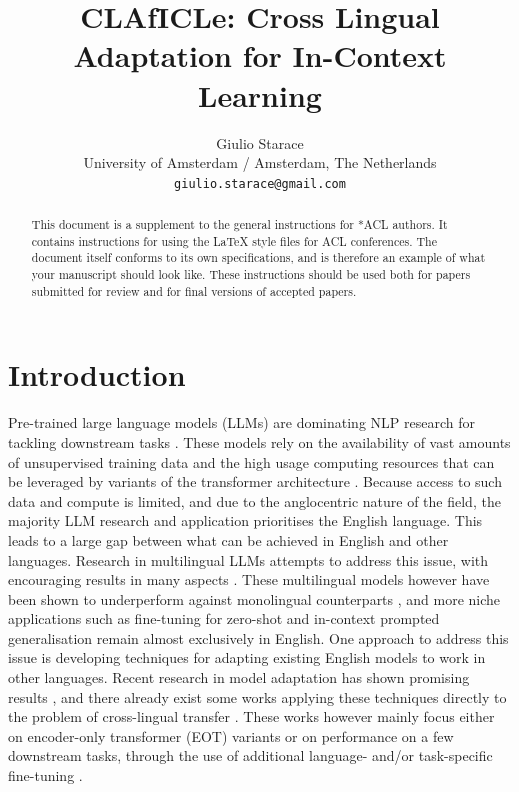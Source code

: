 \documentclass[11pt]{article}
\title{CLAfICLe: Cross Lingual Adaptation for In-Context Learning}
\author{Giulio Starace \\
  University of Amsterdam / Amsterdam, The Netherlands \\
  \texttt{giulio.starace@gmail.com} \\}
\begin{document}
\maketitle
\begin{abstract}
	This document is a supplement to the general instructions for *ACL authors. It contains instructions for using the \LaTeX{} style files for ACL conferences.
	The document itself conforms to its own specifications, and is therefore an example of what your manuscript should look like.
	These instructions should be used both for papers submitted for review and for final versions of accepted papers.
\end{abstract}

\section{Introduction}

Pre-trained large language models (LLMs) are dominating NLP research for tackling downstream tasks
\citep{devlin_bert_2019,raffel_exploring_2020,brown_language_2020}. These models rely on the
availability of vast amounts of unsupervised training data and the high usage computing resources
that can be leveraged by variants of the transformer architecture \citep{vaswani_attention_2017}.
Because access to such data and compute is limited, and due to the anglocentric nature of the field,
the majority LLM research and application prioritises the English language. This leads to a large
gap between what can be achieved in English and other languages. Research in multilingual LLMs
attempts to address this issue, with encouraging results in many aspects
\citep{conneau_unsupervised_2020,bigscience_workshop_bloom_2022}. These multilingual models however
have been shown to underperform against monolingual counterparts \citep{wu_are_2020}, and more niche
applications such as fine-tuning for zero-shot and in-context prompted generalisation
\citep{sanh_multitask_2022,wang_benchmarking_2022} remain almost exclusively in English. One
approach to address this issue is developing techniques for adapting existing English models to work
in other languages. Recent research in model adaptation has shown promising results
\citep{houlsby_parameter-efficient_2019,ainsworth_git_2022}, and there already exist some works
applying these techniques directly to the problem of cross-lingual transfer
\citep{artetxe_cross-lingual_2020}. These works however mainly focus either on encoder-only
transformer (EOT) variants or on performance on a few downstream tasks, through the use of
additional language- and/or task-specific fine-tuning
\citet{de_vries_adapting_2021,de_vries_as_2021,gogoulou_cross-lingual_2022}. 
\end{document}
